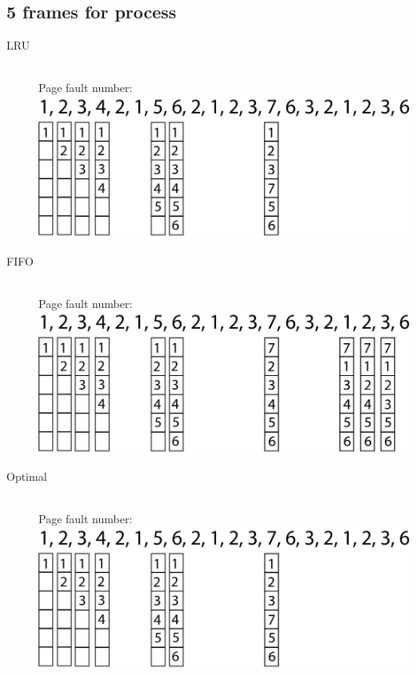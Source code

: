 \documentclass{article}
\begin{document}
\subsection{5 frames for process}
\begin{description}
    \item[LRU] \hfill \\ 
    Page fault number:\\
    \includegraphics[width=1\linewidth]{./LRU6.png} 
    \item[FIFO] \hfill \\
    Page fault number:\\
    \includegraphics[width=1\linewidth]{./FIFO6.png} 
    \item[Optimal] \hfill \\
    Page fault number:\\
    \includegraphics[width=1\linewidth]{./Optimal6.png} 
\end{description}
\end{document}
